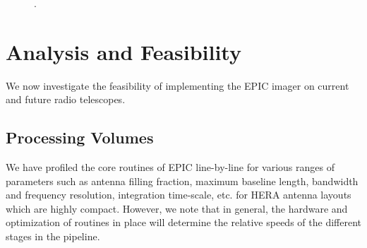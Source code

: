 \documentclass[a4paper,fleqn,usenatbib]{mnras}
\begin{document}
\begin{figure}
\caption{.}
\label{fig:versatility}
\end{figure}

\section{Analysis and Feasibility}\label{sec:analysis}

We now investigate the feasibility of implementing the EPIC imager on current
and future radio telescopes. 

\subsection{Processing Volumes}

We have profiled the core routines of EPIC line-by-line for various ranges of 
parameters such as antenna filling fraction, maximum baseline length, bandwidth 
and frequency resolution, integration time-scale, etc. for HERA antenna layouts 
which are highly compact. However, we note that in general, the hardware and 
optimization of routines in place will determine the relative speeds of the 
different stages in the pipeline. 
\end{document}
